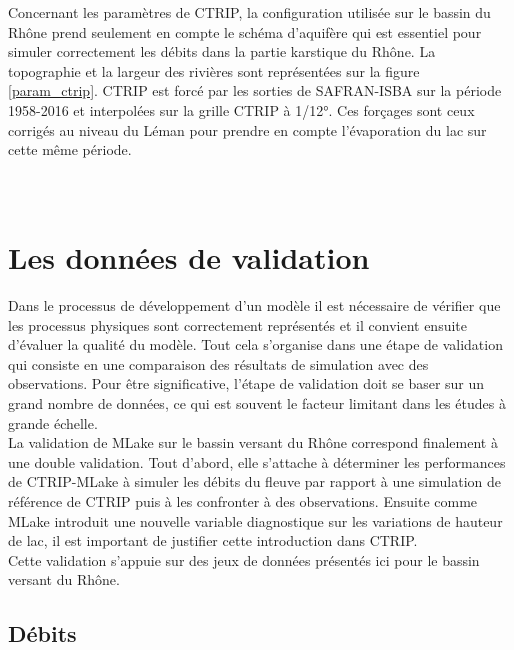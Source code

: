 Concernant les paramètres de CTRIP, la configuration utilisée sur le bassin du Rhône prend seulement en compte le schéma d'aquifère qui est essentiel pour simuler correctement les débits dans la partie karstique du Rhône. La topographie et la largeur des rivières sont représentées sur la figure \ref{param_ctrip}. CTRIP est forcé par les sorties de SAFRAN-ISBA sur la période 1958-2016 et interpolées sur la grille CTRIP à 1/12°. Ces forçages sont ceux corrigés au niveau du Léman pour prendre en compte l'évaporation du lac sur cette même période.
~\\
~\\
~\\

\section{{\selectfont Les données de validation }}
\label{sec:observations_rhone}
Dans le processus de développement d'un modèle il est nécessaire de vérifier que les processus physiques sont correctement représentés et il convient ensuite d'évaluer la qualité du modèle. Tout cela s'organise dans une étape de validation qui consiste en une comparaison des résultats de simulation avec des observations. Pour être significative, l'étape de validation doit se baser sur un grand nombre de données, ce qui est souvent le facteur limitant dans les études à grande échelle.\\
La validation de MLake sur le bassin versant du Rhône correspond finalement à une double validation. Tout d'abord, elle s'attache à déterminer les performances de CTRIP-MLake à simuler les débits du fleuve par rapport à une simulation de référence de CTRIP puis à les confronter à des observations. Ensuite comme MLake introduit une nouvelle variable diagnostique sur les variations de hauteur de lac, il est important de justifier cette introduction dans CTRIP.\\
Cette validation s'appuie sur des jeux de données présentés ici pour le bassin versant du Rhône.

\subsection*{{\selectfont Débits}}

